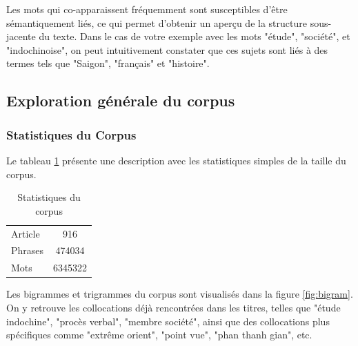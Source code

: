 Les mots qui co-apparaissent fréquemment sont susceptibles d'être sémantiquement liés, ce qui permet d'obtenir un aperçu de la structure sous-jacente du texte. Dans le cas de votre exemple avec les mots "étude", "société", et "indochinoise", on peut intuitivement constater que ces sujets sont liés à des termes tels que "Saigon", "français" et "histoire".



\subsection{Exploration générale du corpus}
\subsubsection{Statistiques du Corpus}
Le tableau \ref{Tab:statscorpus} présente une description avec les statistiques simples de la taille du corpus.

\begin{table}[H]
\caption{Statistiques du corpus}
\centering
\bigskip
\begin{tabular}{lc}
    \hline
    Article &  916 \\
    Phrases &  474034  \\
    Mots &  6345322 \\
    \hline
\end{tabular}
 \label{Tab:statscorpus}
\end{table}
\bigskip

Les bigrammes et trigrammes du corpus sont visualisés dans la figure \ref{fig:bigram}. On y retrouve les collocations déjà rencontrées dans les titres, telles que "étude indochine", "procès verbal", "membre société", ainsi que des collocations plus spécifiques comme "extrême orient", "point vue", "phan thanh gian", etc.


